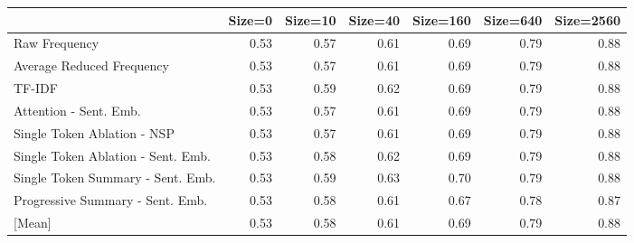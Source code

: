 \begin{tabular}{lrrrrrr}
\toprule
 & Size=0 & Size=10 & Size=40 & Size=160 & Size=640 & Size=2560 \\
\midrule
Raw Frequency & \cellcolor[RGB]{58,76,192}0.53 & \cellcolor[RGB]{93,125,230}0.57 & \cellcolor[RGB]{133,168,251}0.61 & \cellcolor[RGB]{209,218,232}0.69 & \cellcolor[RGB]{244,155,124}0.79 & \cellcolor[RGB]{179,3,38}0.88 \\
Average Reduced Frequency & \cellcolor[RGB]{58,76,192}0.53 & \cellcolor[RGB]{93,125,230}0.57 & \cellcolor[RGB]{133,168,251}0.61 & \cellcolor[RGB]{209,218,232}0.69 & \cellcolor[RGB]{244,155,124}0.79 & \cellcolor[RGB]{179,3,38}0.88 \\
TF-IDF & \cellcolor[RGB]{58,76,192}0.53 & \cellcolor[RGB]{112,147,243}0.59 & \cellcolor[RGB]{142,177,253}0.62 & \cellcolor[RGB]{209,218,232}0.69 & \cellcolor[RGB]{244,155,124}0.79 & \cellcolor[RGB]{179,3,38}0.88 \\
Attention - Sent. Emb. & \cellcolor[RGB]{58,76,192}0.53 & \cellcolor[RGB]{93,125,230}0.57 & \cellcolor[RGB]{133,168,251}0.61 & \cellcolor[RGB]{209,218,232}0.69 & \cellcolor[RGB]{244,155,124}0.79 & \cellcolor[RGB]{179,3,38}0.88 \\
Single Token Ablation - NSP & \cellcolor[RGB]{58,76,192}0.53 & \cellcolor[RGB]{93,125,230}0.57 & \cellcolor[RGB]{133,168,251}0.61 & \cellcolor[RGB]{209,218,232}0.69 & \cellcolor[RGB]{244,155,124}0.79 & \cellcolor[RGB]{179,3,38}0.88 \\
Single Token Ablation - Sent. Emb. & \cellcolor[RGB]{58,76,192}0.53 & \cellcolor[RGB]{103,136,237}0.58 & \cellcolor[RGB]{142,177,253}0.62 & \cellcolor[RGB]{209,218,232}0.69 & \cellcolor[RGB]{244,155,124}0.79 & \cellcolor[RGB]{179,3,38}0.88 \\
Single Token Summary - Sent. Emb. & \cellcolor[RGB]{58,76,192}0.53 & \cellcolor[RGB]{112,147,243}0.59 & \cellcolor[RGB]{153,186,254}0.63 & \cellcolor[RGB]{217,220,224}0.70 & \cellcolor[RGB]{244,155,124}0.79 & \cellcolor[RGB]{179,3,38}0.88 \\
Progressive Summary - Sent. Emb. & \cellcolor[RGB]{58,76,192}0.53 & \cellcolor[RGB]{103,136,237}0.58 & \cellcolor[RGB]{133,168,251}0.61 & \cellcolor[RGB]{192,211,245}0.67 & \cellcolor[RGB]{246,167,137}0.78 & \cellcolor[RGB]{190,35,45}0.87 \\
\midrule
{[Mean]} & \cellcolor[RGB]{58,76,192}0.53 & \cellcolor[RGB]{100,133,235}0.58 & \cellcolor[RGB]{138,173,253}0.61 & \cellcolor[RGB]{208,218,233}0.69 & \cellcolor[RGB]{244,157,126}0.79 & \cellcolor[RGB]{179,3,38}0.88 \\
\bottomrule
\end{tabular}